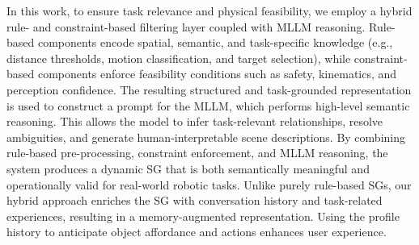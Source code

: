 \documentclass[lettersize,journal]{IEEEtran}
\begin{document}
In this work, to ensure task relevance and physical feasibility, we employ a hybrid rule- and constraint-based filtering layer coupled with MLLM reasoning. Rule-based components encode spatial, semantic, and task-specific knowledge (e.g., distance thresholds, motion classification, and target selection), while constraint-based components enforce feasibility conditions such as safety, kinematics, and perception confidence. The resulting structured and task-grounded representation is used to construct a prompt for the MLLM, which performs high-level semantic reasoning. This allows the model to infer task-relevant relationships, resolve ambiguities, and generate human-interpretable scene descriptions. By combining rule-based pre-processing, constraint enforcement, and MLLM reasoning, the system produces a dynamic SG that is both semantically meaningful and operationally valid for real-world robotic tasks. Unlike purely rule-based SGs, our hybrid approach enriches the SG with conversation history and task-related experiences, resulting in a memory-augmented representation. Using the profile history to anticipate object affordance and actions enhances  user experience.

\end{document}
